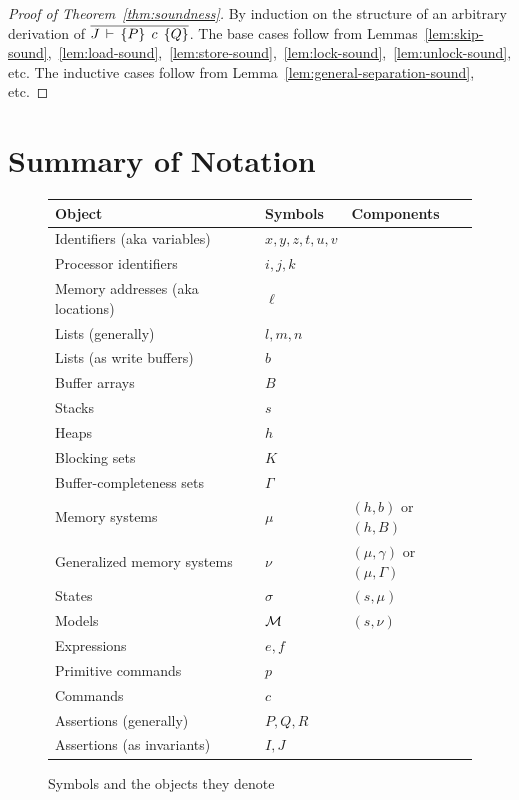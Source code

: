 \documentclass[11pt]{report}         %
\begin{document}
\begin{proof}[Proof of Theorem~\ref{thm:soundness}]

By induction on the structure of an arbitrary derivation of $\overline{J\,\vdash\,\left\lbrace P \right\rbrace\;c\;\left\lbrace Q \right\rbrace}$. The base cases follow from Lemmas~\ref{lem:skip-sound},~\ref{lem:load-sound},~\ref{lem:store-sound},~\ref{lem:lock-sound},~\ref{lem:unlock-sound}, etc. The inductive cases follow from Lemma~\ref{lem:general-separation-sound}, etc. 

\end{proof}

\section{Summary of Notation}

\begin{figure}
\centering
\begin{tabular}{l|l|l}
Object & Symbols & Components\\  
\hline 
Identifiers (aka variables) & $x,y,z,t,u,v$ & \\
Processor identifiers & $i,j,k$ & \\ 
Memory addresses (aka locations) & $\ell$ & \\ 
Lists (generally) & $l,m,n$ & \\ 
Lists (as write buffers) & $b$ & \\ 
Buffer arrays & $B$ & \\ 
Stacks & $s$ & \\ 
Heaps & $h$ & \\ 
Blocking sets & $K$ & \\ 
Buffer-completeness sets & $\Gamma$ & \\ 
Memory systems & $\mu$ & $(h,b)$ or $(h,B)$\\ 
Generalized memory systems & $\nu$ & $(\mu,\gamma)$ or $(\mu,\Gamma)$ \\ 
States & $\sigma$ & $(s,\mu)$\\ 
Models & $\mathcal{M}$ & $(s,\nu)$\\ 
Expressions & $e,f$ \\ 
Primitive commands & $p$ \\
Commands & $c$ \\ 
Assertions (generally) & $P,Q,R$ \\
Assertions (as invariants) & $I,J$ \\
\end{tabular}
\caption{Symbols and the objects they denote\label{fig:objects-and-symbols}}
\end{figure}
\end{document}
